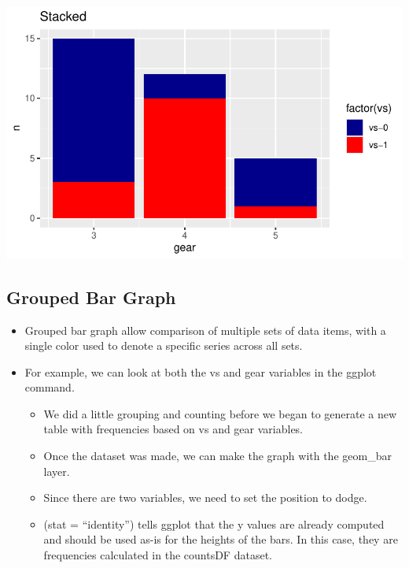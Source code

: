 \documentclass[
  letterpaper,
  DIV=11,
  numbers=noendperiod]{scrreprt}
\providecommand{\tightlist}{%
  \setlength{\itemsep}{0pt}\setlength{\parskip}{0pt}}\usepackage{longtable,booktabs,array}
\begin{document}
\includegraphics{dataviz_files/figure-pdf/unnamed-chunk-35-2.pdf}

\subsection{Grouped Bar Graph}\label{grouped-bar-graph}

\begin{itemize}
\tightlist
\item
  Grouped bar graph allow comparison of multiple sets of data items,
  with a single color used to denote a specific series across all sets.
\item
  For example, we can look at both the vs and gear variables in the
  ggplot command.

  \begin{itemize}
  \tightlist
  \item
    We did a little grouping and counting before we began to generate a
    new table with frequencies based on vs and gear variables.
  \item
    Once the dataset was made, we can make the graph with the geom\_bar
    layer.
  \item
    Since there are two variables, we need to set the position to dodge.
  \item
    (stat = ``identity'') tells ggplot that the y values are already
    computed and should be used as-is for the heights of the bars. In
    this case, they are frequencies calculated in the countsDF dataset.
  \end{itemize}
\end{itemize}
\end{document}
